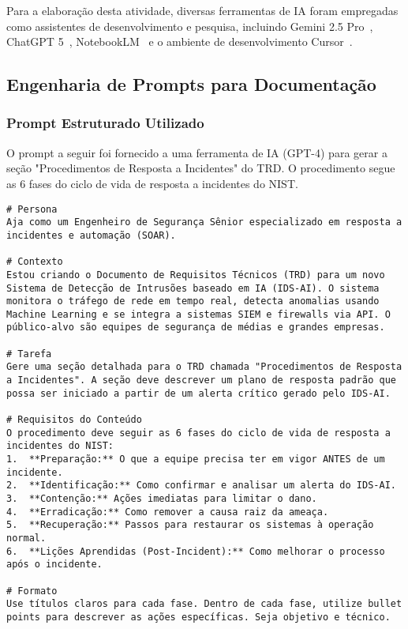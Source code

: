 \documentclass[a4paper,12pt]{article}
\begin{document}
Para a elaboração desta atividade, diversas ferramentas de IA foram empregadas como assistentes de desenvolvimento e pesquisa, incluindo Gemini 2.5 Pro~\cite{gemini25}, ChatGPT 5~\cite{chatgpt5}, NotebookLM~\cite{notebooklm_ref} e o ambiente de desenvolvimento Cursor~\cite{cursor}.

\subsection{Engenharia de Prompts para Documentação}

\subsubsection{Prompt Estruturado Utilizado}
O prompt a seguir foi fornecido a uma ferramenta de IA (GPT-4\cite{openai_gpt4}) para gerar a seção "Procedimentos de Resposta a Incidentes" do TRD. O procedimento segue as 6 fases do ciclo de vida de resposta a incidentes do NIST\cite{nist_sp800_61r2}.

\begin{lstlisting}[caption=Prompt para Geração de Seção do TRD]
# Persona
Aja como um Engenheiro de Segurança Sênior especializado em resposta a incidentes e automação (SOAR).

# Contexto
Estou criando o Documento de Requisitos Técnicos (TRD) para um novo Sistema de Detecção de Intrusões baseado em IA (IDS-AI). O sistema monitora o tráfego de rede em tempo real, detecta anomalias usando Machine Learning e se integra a sistemas SIEM e firewalls via API. O público-alvo são equipes de segurança de médias e grandes empresas.

# Tarefa
Gere uma seção detalhada para o TRD chamada "Procedimentos de Resposta a Incidentes". A seção deve descrever um plano de resposta padrão que possa ser iniciado a partir de um alerta crítico gerado pelo IDS-AI.

# Requisitos do Conteúdo
O procedimento deve seguir as 6 fases do ciclo de vida de resposta a incidentes do NIST:
1.  **Preparação:** O que a equipe precisa ter em vigor ANTES de um incidente.
2.  **Identificação:** Como confirmar e analisar um alerta do IDS-AI.
3.  **Contenção:** Ações imediatas para limitar o dano.
4.  **Erradicação:** Como remover a causa raiz da ameaça.
5.  **Recuperação:** Passos para restaurar os sistemas à operação normal.
6.  **Lições Aprendidas (Post-Incident):** Como melhorar o processo após o incidente.

# Formato
Use títulos claros para cada fase. Dentro de cada fase, utilize bullet points para descrever as ações específicas. Seja objetivo e técnico.
\end{lstlisting}
\end{document}
